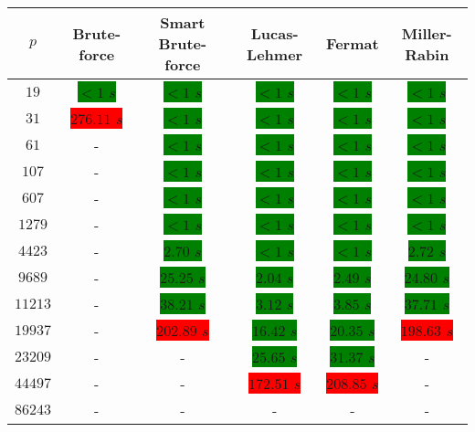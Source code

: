 \documentclass[main.tex]{subfiles}
\begin{document}
\begin{table}[ht!]
  \centering
  \begin{tabular}{||c | c c c c c||}
    \hline
    $p$ & Brute-force & Smart Brute-force & Lucas-Lehmer & Fermat & Miller-Rabin  \\ [0.5ex] 
    \hline\hline
    $19$ & \colorbox{green}{$<1$ $s$} & \colorbox{green}{$<1$ $s$} & \colorbox{green}{$<1$ $s$} & \colorbox{green}{$<1$ $s$} & \colorbox{green}{$<1$ $s$}\\
    $31$ & \colorbox{red}{$276.11$ $s$} & \colorbox{green}{$<1$ $s$} & \colorbox{green}{$<1$ $s$} & \colorbox{green}{$<1$ $s$} & \colorbox{green}{$<1$ $s$}\\
    $61$ & - & \colorbox{green}{$<1$ $s$} & \colorbox{green}{$<1$ $s$} & \colorbox{green}{$<1$ $s$} & \colorbox{green}{$<1$ $s$}\\
    $107$ & - & \colorbox{green}{$<1$ $s$} & \colorbox{green}{$<1$ $s$} & \colorbox{green}{$<1$ $s$} & \colorbox{green}{$<1$ $s$}\\
    $607$ & - & \colorbox{green}{$<1$ $s$} & \colorbox{green}{$<1$ $s$} & \colorbox{green}{$<1$ $s$} & \colorbox{green}{$<1$ $s$}\\
    $1279$ & - & \colorbox{green}{$<1$ $s$} & \colorbox{green}{$<1$ $s$} & \colorbox{green}{$<1$ $s$} & \colorbox{green}{$<1$ $s$}\\
    $4423$ & - & \colorbox{green}{$2.70$ $s$} & \colorbox{green}{$<1$ $s$} & \colorbox{green}{$<1$ $s$} & \colorbox{green}{$2.72$ $s$}\\
    $9689$ & - & \colorbox{green}{$25.25$ $s$} & \colorbox{green}{$2.04$ $s$} & \colorbox{green}{$2.49$ $s$} & \colorbox{green}{$24.80$ $s$}\\
    $11213$ & - & \colorbox{green}{$38.21$ $s$} & \colorbox{green}{$3.12$ $s$} & \colorbox{green}{$3.85$ $s$} & \colorbox{green}{$37.71$ $s$}\\
    $19937$ & - & \colorbox{red}{$202.89$ $s$} & \colorbox{green}{$16.42$ $s$} & \colorbox{green}{$20.35$ $s$} &  \colorbox{red}{$198.63$ $s$}\\
    $23209$ & - & - & \colorbox{green}{$25.65$ $s$} & \colorbox{green}{$31.37$ $s$} & -\\ 
    $44497$ & - & - &  \colorbox{red}{$172.51$ $s$} &  \colorbox{red}{$208.85$ $s$} & -\\ 
    $86243$ & - & - & - & - & -\\  [1ex] 
    \hline
  \end{tabular}
\end{table}
\end{document}
